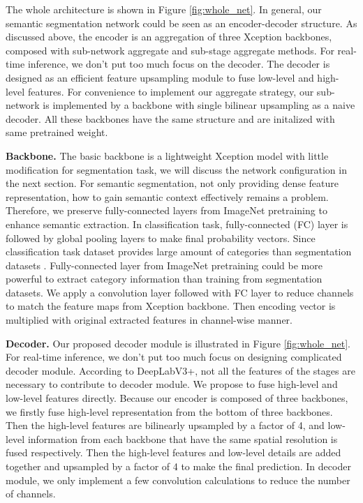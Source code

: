 \documentclass[10pt,twocolumn,letterpaper]{article}
\begin{document}
The whole architecture is shown in Figure \ref{fig:whole_net}. In general, our semantic segmentation network could be seen as an encoder-decoder structure. As discussed above, the encoder is an aggregation of three Xception backbones, composed with sub-network aggregate and sub-stage aggregate methods. For real-time inference, we don't put too much focus on the decoder. The decoder is designed as an efficient feature upsampling module to fuse low-level and high-level features.
For convenience to implement our aggregate strategy, our sub-network is implemented by a backbone with single bilinear upsampling as a naive decoder.
All these backbones have the same structure and are initalized with same pretrained weight.

\textbf{Backbone.} The basic backbone is a lightweight Xception model with little modification for segmentation task, we will discuss the network configuration in the next section. For semantic segmentation, not only providing dense feature representation, how to gain semantic context effectively remains a problem. Therefore, we preserve fully-connected layers from ImageNet pretraining to enhance semantic extraction. 
In classification task, fully-connected (FC) layer is followed by global pooling layers to make final probability vectors. Since classification task dataset \cite{imagenet} provides large amount of categories than segmentation datasets \cite{VOC}\cite{ADE20K}. Fully-connected layer from ImageNet pretraining could be more powerful to extract category information than training from segmentation datasets. 
We apply a  convolution layer followed with FC layer to reduce channels to match the feature maps from Xception backbone. 
Then  encoding vector is multiplied with original extracted features in channel-wise manner.

\textbf{Decoder.} Our proposed decoder module is illustrated in Figure \ref{fig:whole_net}. For real-time inference, we don't put too much focus on designing complicated decoder module. According to DeepLabV3+\cite{deeplabv3plus}, not all the features of the stages are necessary to contribute to decoder module. We propose to fuse high-level and low-level features directly. Because our encoder is composed of three backbones, we firstly fuse high-level representation from the bottom of three backbones. Then the high-level features are bilinearly upsampled by a factor of 4, and low-level information from each backbone that have the same spatial resolution is fused respectively. Then the high-level features and low-level details are added together and upsampled by a factor of 4 to make the final prediction. In decoder module, we only implement a few convolution calculations to reduce the number of channels.
\end{document}
